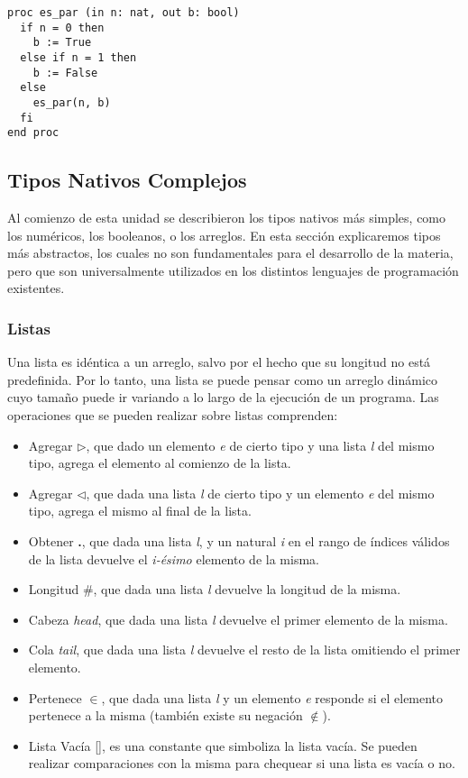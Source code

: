 \documentclass{article}
\begin{document}
\begin{lstlisting}
proc es_par (in n: nat, out b: bool)
  if n = 0 then
    b := True
  else if n = 1 then
    b := False
  else
    es_par(n, b)
  fi
end proc
\end{lstlisting}

\subsection{Tipos Nativos Complejos}
Al comienzo de esta unidad se describieron los tipos nativos más simples, como los numéricos, los booleanos, o los arreglos.
En esta sección explicaremos tipos más abstractos, los cuales no son fundamentales para el desarrollo de la materia, pero que son universalmente utilizados en los distintos lenguajes de programación existentes.

\subsubsection{Listas}
Una lista es idéntica a un arreglo, salvo por el hecho que su longitud no está predefinida.
Por lo tanto, una lista se puede pensar como un arreglo dinámico cuyo tamaño puede ir variando a lo largo de la ejecución de un programa.
Las operaciones que se pueden realizar sobre listas comprenden:

\begin{itemize}
\item Agregar $\triangleright$, que dado un elemento \textit{e} de cierto tipo y una lista \textit{l} del mismo tipo, agrega el elemento al comienzo de la lista.
\item Agregar $\triangleleft$, que dada una lista \textit{l} de cierto tipo y un elemento \textit{e} del mismo tipo, agrega el mismo al final de la lista.
\item Obtener \textbf{.}, que dada una lista \textit{l}, y un natural \textit{i} en el rango de índices válidos de la lista devuelve el \textit{i-ésimo} elemento de la misma.
\item Longitud \#, que dada una lista \textit{l} devuelve la longitud de la misma.
\item Cabeza \textit{head}, que dada una lista \textit{l} devuelve el primer elemento de la misma.
\item Cola \textit{tail}, que dada una lista \textit{l} devuelve el resto de la lista omitiendo el primer elemento.
\item Pertenece $\in$, que dada una lista \textit{l} y un elemento \textit{e} responde si el elemento pertenece a la misma (también existe su negación $\notin$).
\item Lista Vacía [\space], es una constante que simboliza la lista vacía.
Se pueden realizar comparaciones con la misma para chequear si una lista es vacía o no.
\end{itemize}
\end{document}
